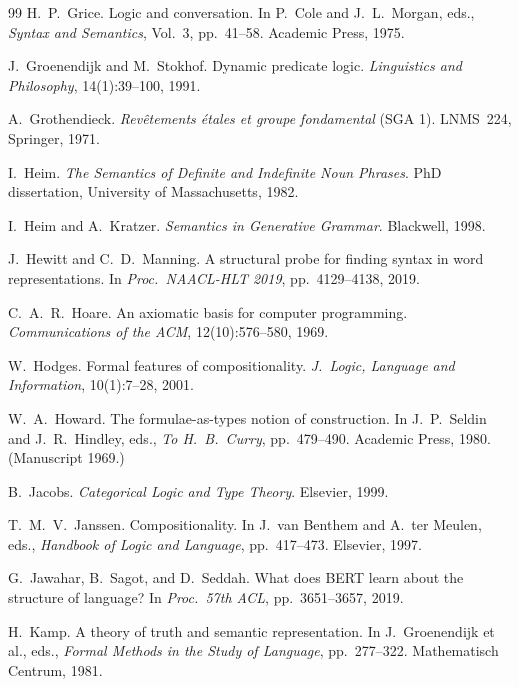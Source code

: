 \documentclass[12pt,a4paper]{article}
\begin{document}
\begin{thebibliography}{99}
H.~P.~Grice.
\newblock Logic and conversation.
\newblock In P.~Cole and J.~L.~Morgan, eds., \emph{Syntax and Semantics}, Vol.~3, pp.~41--58. Academic Press, 1975.

J.~Groenendijk and M.~Stokhof.
\newblock Dynamic predicate logic.
\newblock \emph{Linguistics and Philosophy}, 14(1):39--100, 1991.

A.~Grothendieck.
\newblock \emph{Rev\^{e}tements \'{e}tales et groupe fondamental} (SGA 1).
\newblock LNMS~224, Springer, 1971.

I.~Heim.
\newblock \emph{The Semantics of Definite and Indefinite Noun Phrases}.
\newblock PhD dissertation, University of Massachusetts, 1982.

I.~Heim and A.~Kratzer.
\newblock \emph{Semantics in Generative Grammar}.
\newblock Blackwell, 1998.

J.~Hewitt and C.~D.~Manning.
\newblock A structural probe for finding syntax in word representations.
\newblock In \emph{Proc.\ NAACL-HLT 2019}, pp.~4129--4138, 2019.

C.~A.~R.~Hoare.
\newblock An axiomatic basis for computer programming.
\newblock \emph{Communications of the ACM}, 12(10):576--580, 1969.

W.~Hodges.
\newblock Formal features of compositionality.
\newblock \emph{J.\ Logic, Language and Information}, 10(1):7--28, 2001.

W.~A.~Howard.
\newblock The formulae-as-types notion of construction.
\newblock In J.~P.~Seldin and J.~R.~Hindley, eds., \emph{To H.~B.~Curry}, pp.~479--490. Academic Press, 1980. (Manuscript 1969.)

B.~Jacobs.
\newblock \emph{Categorical Logic and Type Theory}.
\newblock Elsevier, 1999.

T.~M.~V.~Janssen.
\newblock Compositionality.
\newblock In J.~van Benthem and A.~ter Meulen, eds., \emph{Handbook of Logic and Language}, pp.~417--473. Elsevier, 1997.

G.~Jawahar, B.~Sagot, and D.~Seddah.
\newblock What does BERT learn about the structure of language?
\newblock In \emph{Proc.\ 57th ACL}, pp.~3651--3657, 2019.

H.~Kamp.
\newblock A theory of truth and semantic representation.
\newblock In J.~Groenendijk et al., eds., \emph{Formal Methods in the Study of Language}, pp.~277--322. Mathematisch Centrum, 1981.


\end{thebibliography}
\end{document}
